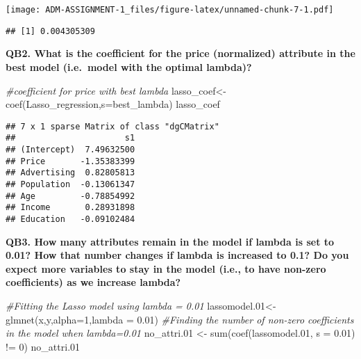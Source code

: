 \documentclass[
]{article}
\newenvironment{Shaded}{\begin{snugshade}}{\end{snugshade}}
\newcommand{\AttributeTok}[1]{\textcolor[rgb]{0.77,0.63,0.00}{#1}}
\newcommand{\CommentTok}[1]{\textcolor[rgb]{0.56,0.35,0.01}{\textit{#1}}}
\newcommand{\DecValTok}[1]{\textcolor[rgb]{0.00,0.00,0.81}{#1}}
\newcommand{\FloatTok}[1]{\textcolor[rgb]{0.00,0.00,0.81}{#1}}
\newcommand{\FunctionTok}[1]{\textcolor[rgb]{0.00,0.00,0.00}{#1}}
\newcommand{\NormalTok}[1]{#1}
\newcommand{\OtherTok}[1]{\textcolor[rgb]{0.56,0.35,0.01}{#1}}
\newcommand{\SpecialCharTok}[1]{\textcolor[rgb]{0.00,0.00,0.00}{#1}}
\begin{document}
\texttt{[image: ADM-ASSIGNMENT-1\_files/figure-latex/unnamed-chunk-7-1.pdf]}

\begin{Shaded}
\end{Shaded}

\begin{verbatim}
## [1] 0.004305309
\end{verbatim}

\textbf{QB2. What is the coefficient for the price (normalized)
attribute in the best model (i.e.~model with the optimal lambda)?}

\begin{Shaded}
\begin{Highlighting}[]
\CommentTok{\#coefficient for price with best lambda}
\NormalTok{lasso\_coef}\OtherTok{\textless{}{-}}\FunctionTok{coef}\NormalTok{(Lasso\_regression,}\AttributeTok{s=}\NormalTok{best\_lambda)}
\NormalTok{lasso\_coef}
\end{Highlighting}
\end{Shaded}

\begin{verbatim}
## 7 x 1 sparse Matrix of class "dgCMatrix"
##                      s1
## (Intercept)  7.49632500
## Price       -1.35383399
## Advertising  0.82805813
## Population  -0.13061347
## Age         -0.78854992
## Income       0.28931898
## Education   -0.09102484
\end{verbatim}

\textbf{QB3. How many attributes remain in the model if lambda is set to
0.01? How that number changes if lambda is increased to 0.1? Do you
expect more variables to stay in the model (i.e., to have non-zero
coefficients) as we increase lambda?}

\begin{Shaded}
\begin{Highlighting}[]
\CommentTok{\#Fitting the Lasso model using lambda = 0.01}
\NormalTok{lassomodel}\FloatTok{.01}\OtherTok{\textless{}{-}} \FunctionTok{glmnet}\NormalTok{(x,y,}\AttributeTok{alpha=}\DecValTok{1}\NormalTok{,}\AttributeTok{lambda =} \FloatTok{0.01}\NormalTok{)}
\CommentTok{\#Finding the number of non{-}zero coefficients in the model when lambda=0.01}
\NormalTok{no\_attri}\FloatTok{.01} \OtherTok{\textless{}{-}} \FunctionTok{sum}\NormalTok{(}\FunctionTok{coef}\NormalTok{(lassomodel}\FloatTok{.01}\NormalTok{, }\AttributeTok{s =} \FloatTok{0.01}\NormalTok{) }\SpecialCharTok{!=} \DecValTok{0}\NormalTok{)}
\NormalTok{no\_attri}\FloatTok{.01}
\end{Highlighting}
\end{Shaded}
\end{document}

